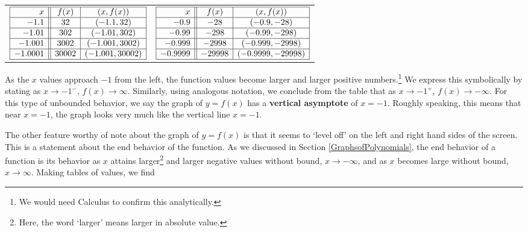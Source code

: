 \begin{center}
\begin{tabular}{cc}

$\begin{array}{|r||c|c|}  \hline

  x & f(x) & (x,f(x)) \\ \hline
 -1.1 & 32 & (-1.1, 32) \\  \hline
 -1.01 & 302 & (-1.01, 302) \\  \hline 
 -1.001 & 3002 & ( -1.001, 3002) \\  \hline 
  -1.0001 & 30002 & ( -1.001, 30002) \\  \hline 
  \end{array} $ \hspace{.75in} & 

$\begin{array}{|r||c|c|}  \hline 
  x & f(x) & (x,f(x)) \\ \hline
  -0.9 & -28 & ( -0.9 , -28) \\  \hline
  -0.99 & -298 & ( -0.99, -298) \\  \hline
  -0.999 & -2998& (-0.999,-2998) \\  \hline
   -0.9999 & -29998& (-0.9999,-29998) \\  \hline 

\end{array}$

\end{tabular}

\end{center}

As the $x$ values approach $-1$ from the left, the function values become larger and larger positive numbers.\footnote{We would need Calculus to confirm this analytically.}  We express this symbolically by stating as $x \rightarrow -1^{-}$, $f(x) \rightarrow \infty$.   Similarly, using analogous notation, we conclude from the table that as $x \rightarrow -1^{+}$, $f(x) \rightarrow -\infty$.  For this type of unbounded behavior, we say the graph of $y=f(x)$ has a \textbf{vertical asymptote} of $x = -1$.  Roughly speaking, this means that near $x=-1$, the graph looks very much like the vertical line $x=-1$. 

\smallskip

The other feature worthy of note about the graph of $y=f(x)$ is that it seems to `level off' on the left and right hand sides of the screen.  This is a statement about the end behavior of the function.  As we discussed in Section \ref{GraphsofPolynomials}, the end behavior of a function is its behavior as $x$ attains larger\footnote{Here, the word `larger' means larger in absolute value.} and larger negative values without bound, $x \rightarrow -\infty$, and as $x$ becomes large without bound, $x \rightarrow \infty$.  Making tables of values, we find

